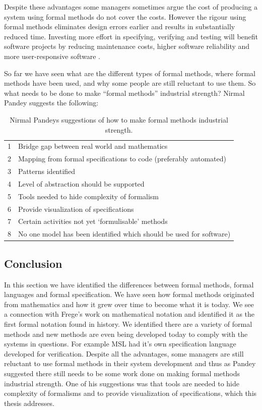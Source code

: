 Despite these advantages some managers sometimes argue the cost of producing a
system using formal methods do not cover the costs. However the rigour using
formal methods eliminates design errors earlier and results in substantially
reduced time. Investing more effort in specifying, verifying and testing will
benefit software projects by reducing maintenance costs, higher software
reliability and more user-responsive software \cite{chantatub}.

So far we have seen what are the different types of formal methods, where formal
methods have been used, and why some people are still reluctant to use them. So
what needs to be done to make “formal methods” industrial strength? Nirmal
Pandey \cite{formalmethodslides} suggests the following: 

\begin{table}[H]
\begin{tabular}{|ll|}
\hline
1 & Bridge gap between real world and mathematics \\
2 & Mapping from formal specifications to code (preferably automated) \\
3 &  Patterns identified \\
4 & Level of abstraction should be supported \\
5 &  Tools needed to hide complexity of formalism \\
6 &  Provide visualization of specifications \\
7 & Certain activities not yet ‘formulisable’ methods \\
8 & No one model has been identified which should be used for software) \\
\hline
\end{tabular}
\caption{Nirmal Pandeys suggestions of how to make formal methods industrial strength. \label{tab:nimpand}}
\end{table}


\subsection{Conclusion}

In this section we have identified the differences between formal methods,
formal languages and formal specification. We have seen how formal methods
originated from mathematics and how it grew over time to become what it is
today. We see a connection with Frege's work on mathematical notation and
identified it as the first formal notation found in history. We identified there
are a variety of formal methods and new methods are even being developed today
to comply with the systems in questions. For example MSL had it's own
specification language developed for verification. Despite all the advantages, some managers are still reluctant to use
formal methods in their system development and thus as Pandey suggested there
still needs to be some work done on making formal methods industrial strength.
One of his suggestions was that tools are needed to hide complexity of
formalisms and to provide visualization of specifications, which this thesis
addresses.

